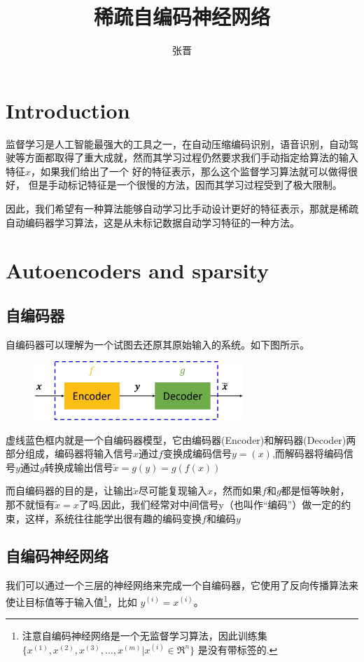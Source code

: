 
\usepackage{framed} 
\usepackage{ulem}
\usepackage{tabu}
\title{\heiti 稀疏自编码神经网络}
\author{张晋}

\maketitle
\section{Introduction}
监督学习是人工智能最强大的工具之一，在自动压缩编码识别，语音识别，自动驾驶等方面都取得了重大成就，然而其学习过程仍然要求我们手动指定给算法的输入特征$x$，如果我们给出了一个
好的特征表示，那么这个监督学习算法就可以做得很好，
但是手动标记特征是一个很慢的方法，因而其学习过程受到了极大限制。

因此，我们希望有一种算法能够自动学习比手动设计更好的特征表示，那就是稀疏自动编码器学习算法，这是从未标记数据自动学习特征的一种方法。


\section{Autoencoders and sparsity}
\subsection{自编码器}
自编码器可以理解为一个试图去还原其原始输入的系统。如下图所示。
\begin{figure}[H]
\centering
\includegraphics[width=8cm]{fig/s1.jpg}
\end{figure}

虚线蓝色框内就是一个自编码器模型，它由编码器(Encoder)和解码器(Decoder)两部分组成，编码器将输入信号$x$通过$f$变换成编码信号$y=(x)$,而解码器将编码信号$y$通过$g$转换成输出信号$\tilde{x}=g(y)=g(f(x))$

而自编码器的目的是，让输出$\tilde{x}$尽可能复现输入$x$，然而如果$f$和$g$都是恒等映射，那不就恒有$\tilde{x}=x$了吗,因此，我们经常对中间信号y（也叫作“编码”）做一定的约束，这样，系统往往能学出很有趣的编码变换$f$和编码$y$


\subsection{自编码神经网络}
我们可以通过一个三层的神经网络来完成一个自编码器，它使用了反向传播算法来使让目标值等于输入值\footnote{注意自编码神经网络是一个无监督学习算法，因此训练集$\{x^{(1)}, x^{(2)}, x^{(3)}, \ldots, x^{(m)}\big|x^{(i)} \in \Re^{n}\}$ 是没有带标签的.}，比如 $ y^{(i)} = x^{(i)} $。

